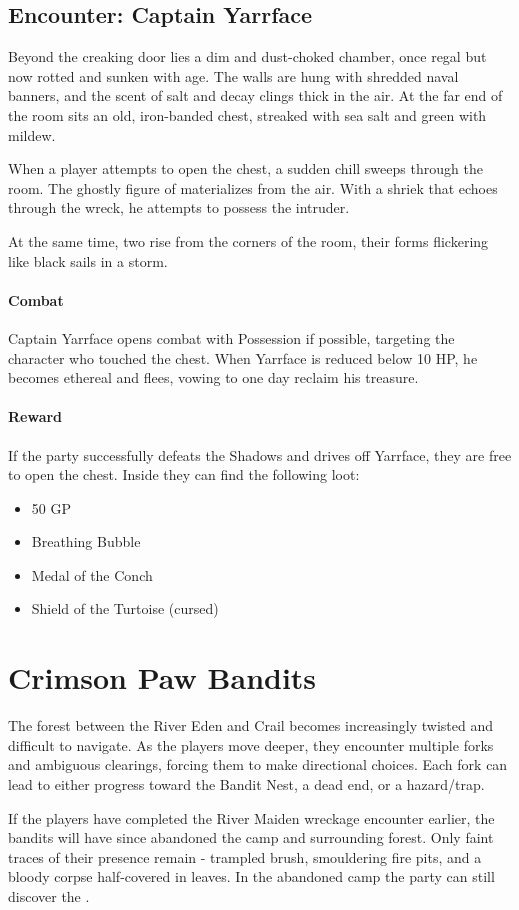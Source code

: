 \subsection*{Encounter: Captain Yarrface}
{\entryfont Beyond the creaking door lies a dim and dust-choked chamber, once regal but now rotted and sunken with age. The walls are hung with shredded naval banners, and the scent of salt and decay clings thick in the air. At the far end of the room sits an old, iron-banded chest, streaked with sea salt and green with mildew.

When a player attempts to open the chest, a sudden chill sweeps through the room. The ghostly figure of \hyperref[monster:CaptainYarrface]{} materializes from the air. With a shriek that echoes through the wreck, he attempts to possess the intruder.

At the same time, two \hyperref[monster:Shadow]{} rise from the corners of the room, their forms flickering like black sails in a storm.

\paragraph*{Combat} Captain Yarrface opens combat with Possession if possible, targeting the character who touched the chest. When Yarrface is reduced below 10 HP, he becomes ethereal and flees, vowing to one day reclaim his treasure.

\paragraph*{Reward} If the party successfully defeats the Shadows and drives off Yarrface, they are free to open the chest. Inside they can find the following loot:
\begin{itemize}
	\item 50 GP
	\item Breathing Bubble 
	\item Medal of the Conch
	\item Shield of the Turtoise (cursed)
\end{itemize}
}

\section*{Crimson Paw Bandits}
{\entryfont The forest between the River Eden and Crail becomes increasingly twisted and difficult to navigate. As the players move deeper, they encounter multiple forks and ambiguous clearings, forcing them to make directional choices. Each fork can lead to either progress toward the Bandit Nest, a dead end, or a hazard/trap.

If the players have completed the River Maiden wreckage encounter earlier, the bandits will have since abandoned the camp and surrounding forest. Only faint traces of their presence remain - trampled brush, smouldering fire pits, and a bloody corpse half-covered in leaves. In the abandoned camp the party can still discover the \hyperref[resource:TatteredDirective]{}.}


